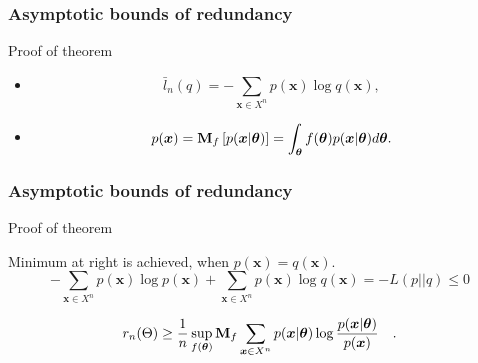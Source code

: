 \documentclass[14pt]{beamer}
\renewcommand{\vec}[1]{\ensuremath{\boldsymbol{#1}}}
\begin{document}
\begin{frame}
\frametitle{Asymptotic bounds of redundancy}
Proof of theorem
\begin{itemize}    

    \item 
    \begin{equation}
    \label{eq31_1a}
    \bar l_n (q) = %
    - \sum_ {\vec x \in X^n} p(\vec x ) \log q(\vec x) ,
    \end{equation}

    \item
    \begin{equation}
    \label{distrib}
     p(\vec x) = {\rm {\bf M}}_f \left[ p(\vec x\vert \vec \theta
    ) \right] = %
    \int_{\vec \theta} f(\vec \theta) p(\vec x\vert \vec \theta ) d\vec
    \theta.
    \end{equation}

\end{itemize}
\end{frame}



\begin{frame}
\frametitle{Asymptotic bounds of redundancy}
Proof of theorem
\begin{itemize}    
\small{

    \item Minimum at right is achieved, when $p(\vec x) =q(\vec x)$. 
    \[
    - \sum_ {\vec x \in X^n} p(\vec x) \log p(\vec x) + \sum_ {\vec x
    \in X^n} p(\vec x) \log q(\vec x) = - L(p||q) \le 0
    \]


    \item
    \begin{equation}
    \label{redundancy5}
     r_n(\Theta ) \ge \frac{1}{n} \mathop {\sup }\limits_{f(\vec \theta)  } %
    {\rm \bf {M}}_f \sum_{\vec x \in X^n} p(\vec x | \vec \theta)%
    \log \frac{p(\vec x | \vec \theta)}{p(\vec x)}\quad .
    \end{equation}
}    
\end{itemize}
\end{frame}
\end{document}
